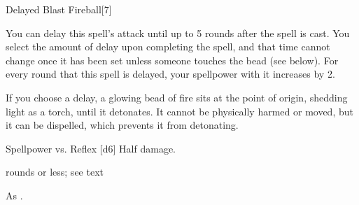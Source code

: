 \begin{spellsection}{Delayed Blast Fireball}[7]
    \begin{spellheader}
    \end{spellheader}
    \begin{spellcontent}
        \begin{spelltargetinginfo}
        \end{spelltargetinginfo}
        \begin{spelleffects}
            \spellspecial You can delay this spell's attack until up to 5 rounds after the spell is cast. You select the amount of delay upon completing the spell, and that time cannot change once it has been set unless someone touches the bead (see below). For every round that this spell is delayed, your spellpower with it increases by 2.

            If you choose a delay, a glowing bead of fire sits at the point of origin, shedding light as a torch, until it detonates. It cannot be physically harmed or moved, but it can be dispelled, which prevents it from detonating.
            \begin{spellattack}{Spellpower vs. Reflex}
                \spellsuccess {}[d6]
                \spellfailure Half damage.
            \end{spellattack}
             rounds or less; see text
        \end{spelleffects}
    \end{spellcontent}
    \begin{spellfooter}
        \spellnotes As .
        \miscastyou
    \end{spellfooter}
\end{spellsection}

